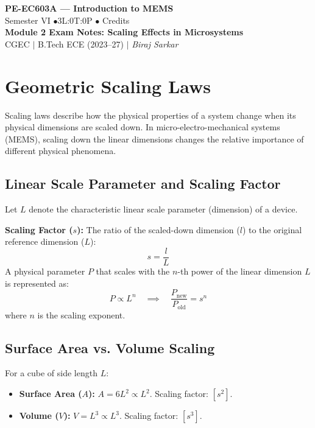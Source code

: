 \documentclass[12pt,a4paper]{article}
\begin{document}

\begin{center}
  {\LARGE\bfseries\color{myred} PE-EC603A --- Introduction to MEMS}\\[5pt]
  {\normalsize\color{mydark} Semester VI \quad$\bullet$\quad 3L:0T:0P \quad$\bullet$ Credits}\\[3pt]
  {\normalsize\color{myteal}\textbf{Module 2 Exam Notes: Scaling Effects in Microsystems}}\\[3pt]
  {\small\color{mydark} CGEC \;$|$\; B.Tech ECE (2023--27) \;$|$\; \textit{Biraj Sarkar}}
\end{center}
\vspace{2pt}
\noindent{\color{myred}\rule{\linewidth}{1.5pt}}
\vspace{2pt}

\hypersetup{linkcolor=mydark}
\tableofcontents
\hypersetup{linkcolor=myteal}
\newpage

\section{Geometric Scaling Laws}

Scaling laws describe how the physical properties of a system change when its physical dimensions are scaled down. In micro-electro-mechanical systems (MEMS), scaling down the linear dimensions changes the relative importance of different physical phenomena.

\subsection{Linear Scale Parameter and Scaling Factor}
Let $L$ denote the characteristic linear scale parameter (dimension) of a device. 
\begin{tcolorbox}[defbox]
\textbf{Scaling Factor ($s$):} The ratio of the scaled-down dimension ($l$) to the original reference dimension ($L$):
$$s = \frac{l}{L}$$
A physical parameter $P$ that scales with the $n$-th power of the linear dimension $L$ is represented as:
$$P \propto L^n \quad \implies \quad \frac{P_{\text{new}}}{P_{\text{old}}} = s^n$$
where $n$ is the scaling exponent.
\end{tcolorbox}

\subsection{Surface Area vs. Volume Scaling}
For a cube of side length $L$:
\begin{itemize}[leftmargin=*, itemsep=3pt]
  \item \textbf{Surface Area ($A$):} $A = 6L^2 \propto L^2$. Scaling factor: $[s^2]$.
  \item \textbf{Volume ($V$):} $V = L^3 \propto L^3$. Scaling factor: $[s^3]$.
\end{itemize}
\end{document}

